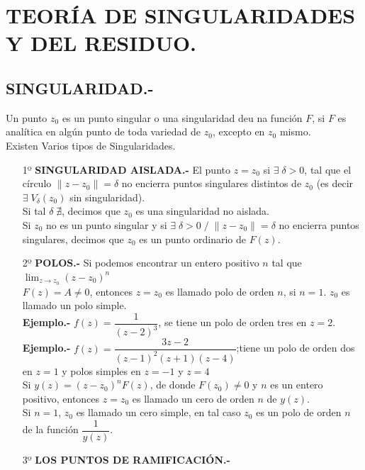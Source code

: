 \documentclass[10pt,a4paper]{article}
\author{José Jácome}
\begin{document}
\section{TEORÍA DE SINGULARIDADES Y DEL RESIDUO.}
\subsection{SINGULARIDAD.-}
Un punto $z_0$ es un punto singular o una singularidad deu na función $F$, si $F$ es analítica en algún punto de toda variedad de $z_0$, excepto en $z_0$ mismo. \\
Existen Varios tipos de Singularidades.
\begin{enumerate}
\item[1º] \textbf{SINGULARIDAD AISLADA.-} El punto $z = z_0$ si $\exists \; \delta > 0$, tal que el círculo $\parallel z-z_0 \parallel= \delta$ no encierra puntos singulares distintos de $z_0$ (es decir $\exists \; V_{\delta} (z_0)$ sin singularidad). \\
Si tal $\delta \; \nexists $, decimos que $z_0$ es una singularidad no aislada. \\
Si $z_0$ no es un punto singular y si $\exists \; \delta > 0 \; / \; \parallel z - z_0 \parallel = \delta$ no encierra puntos singulares, decimos que $z_0$ es un punto ordinario de $F(z)$.
\item[2º] \textbf{POLOS.-} Si podemos encontrar un entero positivo $n$ tal que $\displaystyle{\lim_{ z \to z_0} (z-z_0)^n}$   \\$F(z) = A \neq 0$, entonces $z = z_0$ es llamado polo de orden $n$, si $n = 1$. $z_0$ es llamado un polo simple.\\
\textbf{Ejemplo.-} $f(z) = \dfrac{1}{(z-2)^3}$, se tiene un polo de orden tres en $z = 2$. \\
\textbf{Ejemplo.-} $f(z) = \dfrac{3 z - 2}{(z-1)^2(z+1)(z-4)}$;tiene un polo de orden dos en $z = 1$ y polos simples en $z = -1$ y $z = 4$\\
Si $y(z) = (z-z_0)^n F(z)$, de donde $F(z_0) \neq 0 $ y $n$ es un entero positivo, entonces $z = z_0$ es llamado un cero de orden $n$ de $y(z)$. \\
Si $n = 1$, $z_0$ es llamado un cero simple, en tal caso $z_0$ es un polo de orden $n$ de la función $\dfrac{1}{y(z)}$.
\item[3º] \textbf{LOS PUNTOS DE RAMIFICACIÓN.-} \\

\end{enumerate}
\end{document}
